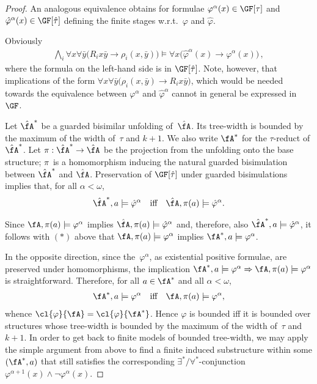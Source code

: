 \documentclass{LMCS}
\begin{document}
\begin{proof}
An analogous equivalence obtains for formulae $\varphi^\alpha(x) \in \GF[\tau]$
and $\hat{\varphi}^\alpha(x) \in \GF[\hat{\tau}]$
defining the finite stages w.r.t.\ $\varphi$ and $\hat{\varphi}$.

Obviously
\begin{align*}
  \bigwedge_i \forall x \forall \bar y \bigl( R_i x\bar y \to \rho_i(x,\bar y) \bigr)
  \models \forall x \bigl( \hat{\varphi}^\alpha(x) \to \varphi^\alpha(x) \bigr)\,,
\tag{$\ast$}
\end{align*}
where the
formula on the left-hand side is in $\GF[\hat{\tau}]$.
Note, however, that implications of the form
$\forall x \forall \bar{y} \bigl( \rho_i(x,\bar{y}) \to R_i x\bar{y} \bigr)$,
which would be needed
towards the equivalence between $\varphi^\alpha$ and $\hat{\varphi}^\alpha$
cannot in general be expressed in $\GF$.

Let $\hat{\fA}^\ast$ be a guarded bisimilar unfolding of~$\hat{\fA}$.
Its tree-width is bounded by the maximum of
the width of~$\tau$ and $k+1$.
We also write $\fA^\ast$ for the $\tau$-reduct of $\hat{\fA}^\ast$.
Let $\pi : \hat{\fA}^\ast \to \hat{\fA}$ be the
projection from the unfolding onto the base structure\?;
$\pi$~is a homomorphism inducing the natural guarded bisimulation
between $\hat{\fA}^\ast$ and $\hat{\fA}$.
Preservation of $\GF[\hat{\tau}]$ under guarded bisimulations implies
that, for all $\alpha < \omega$,
\begin{align*}
  \hat{\fA}^\ast, a \models \hat{\varphi}^\alpha
  \quad\text{iff}\quad
  \hat{\fA}, \pi(a) \models \hat{\varphi}^\alpha.
\end{align*}

Since $\fA,\pi(a) \models \varphi^\alpha$ implies $\hat\fA, \pi(a) \models \hat\varphi^\alpha$
and, therefore, also $\hat\fA^*,a \models \hat\varphi^\alpha$,
it follows with $(\ast)$ above that 
$\fA,\pi(a) \models \varphi^\alpha$ implies 
$\fA^*,a \models \varphi^\alpha$.

In the opposite direction,
since the~$\varphi^\alpha$, as existential positive
formulae, are preserved under homomorphisms,
the implication
$\fA^\ast, a \models \varphi^\alpha \Rightarrow
\fA, \pi(a) \models  \varphi^\alpha$ is straightforward.
Therefore, for all $a \in \fA^\ast$ and all $\alpha < \omega$,
\begin{align*}
  \fA^\ast, a \models \varphi^\alpha
  \quad\text{iff}\quad
  \fA, \pi(a) \models  \varphi^\alpha,
\end{align*}
whence $\cl{\varphi}{\fA} = \cl{\varphi}{\fA^\ast}$.
Hence $\varphi$ is bounded iff it is bounded over structures
whose tree-width is bounded by the
maximum of the width of~$\tau$ and $k+1$.
In order to get back to finite models
of bounded tree-width, we may apply the simple
argument from above to find a finite induced substructure within
some $(\fA^\ast, a)$ that still satisfies the corresponding
$\exists^\ast/\forall^\ast$-conjunction
$\varphi^{\alpha+1}(x) \wedge \neg \varphi^\alpha(x)$.
\end{proof}
\end{document}
